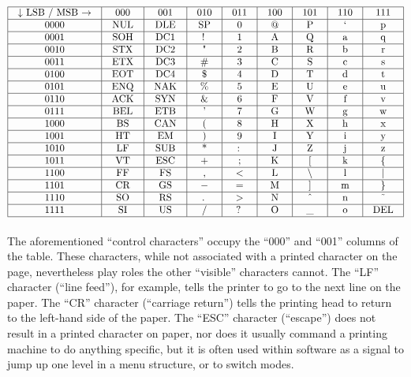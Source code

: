 $$\vbox{\offinterlineskip
\halign{\strut
\vrule \quad\hfil # \ \hfil & 
\vrule \quad\hfil # \ \hfil & 
\vrule \quad\hfil # \ \hfil & 
\vrule \quad\hfil # \ \hfil & 
\vrule \quad\hfil # \ \hfil & 
\vrule \quad\hfil # \ \hfil & 
\vrule \quad\hfil # \ \hfil & 
\vrule \quad\hfil # \ \hfil & 
\vrule \quad\hfil # \ \hfil \vrule \cr
\noalign{\hrule}
%
$\downarrow$ LSB / MSB $\rightarrow$ & 000 & 001 & 010 & 011 & 100 & 101 & 110 & 111 \cr
%
\noalign{\hrule}
%
0000 & NUL & DLE & SP & 0 & @ & P & ` & p \cr
%
\noalign{\hrule}
%
0001 & SOH & DC1 & ! & 1 & A & Q & a & q \cr
%
\noalign{\hrule}
%
0010 & STX & DC2 & " & 2 & B & R & b & r \cr
%
\noalign{\hrule}
%
0011 & ETX & DC3 & \# & 3 & C & S & c & s \cr
%
\noalign{\hrule}
%
0100 & EOT & DC4 & \$ & 4 & D & T & d & t \cr
%
\noalign{\hrule}
%
0101 & ENQ & NAK & \% & 5 & E & U & e & u \cr
%
\noalign{\hrule}
%
0110 & ACK & SYN & \& & 6 & F & V & f & v \cr
%
\noalign{\hrule}
%
0111 & BEL & ETB & ' & 7 & G & W & g & w \cr
%
\noalign{\hrule}
%
1000 & BS & CAN & ( & 8 & H & X & h & x \cr
%
\noalign{\hrule}
%
1001 & HT & EM & ) & 9 & I & Y & i & y \cr
%
\noalign{\hrule}
%
1010 & LF & SUB & * & : & J & Z & j & z \cr
%
\noalign{\hrule}
%
1011 & VT & ESC & + & ; & K & $[$ & k & $\{$ \cr
%
\noalign{\hrule}
%
1100 & FF & FS & , & $<$ & L & $\backslash$ & l & $|$ \cr
%
\noalign{\hrule}
%
1101 & CR & GS & $-$ & $=$ & M & $]$ & m & $\}$ \cr
%
\noalign{\hrule}
%
1110 & SO & RS & . & $>$ & N & \^{} & n & \~{} \cr
%
\noalign{\hrule}
%
1111 & SI & US & / & ? & O & \_ & o & DEL \cr
%
\noalign{\hrule}
} %
}$$ %

The aforementioned ``control characters'' occupy the ``000'' and ``001'' columns of the table.  These characters, while not associated with a printed character on the page, nevertheless play roles the other ``visible'' characters cannot.  The ``LF'' character (``line feed''), for example, tells the printer to go to the next line on the paper.  The ``CR'' character (``carriage return'') tells the printing head to return to the left-hand side of the paper.  The ``ESC'' character (``escape'') does not result in a printed character on paper, nor does it usually command a printing machine to do anything specific, but it is often used within software as a signal to jump up one level in a menu structure, or to switch modes.




